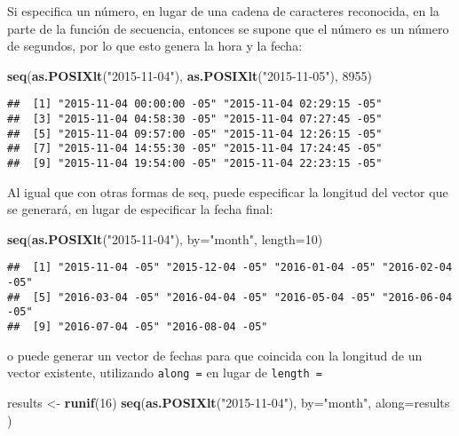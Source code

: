 \documentclass[]{article}
\newenvironment{Shaded}{\begin{snugshade}}{\end{snugshade}}
\newcommand{\KeywordTok}[1]{\textcolor[rgb]{0.13,0.29,0.53}{\textbf{#1}}}
\newcommand{\DataTypeTok}[1]{\textcolor[rgb]{0.13,0.29,0.53}{#1}}
\newcommand{\DecValTok}[1]{\textcolor[rgb]{0.00,0.00,0.81}{#1}}
\newcommand{\StringTok}[1]{\textcolor[rgb]{0.31,0.60,0.02}{#1}}
\newcommand{\NormalTok}[1]{#1}
\begin{document}
Si especifica un número, en lugar de una cadena de caracteres
reconocida, en la parte de la función de secuencia, entonces se supone
que el número es un número de segundos, por lo que esto genera la hora y
la fecha:

\begin{Shaded}
\begin{Highlighting}[]
\KeywordTok{seq}\NormalTok{(}\KeywordTok{as.POSIXlt}\NormalTok{(}\StringTok{"2015-11-04"}\NormalTok{), }\KeywordTok{as.POSIXlt}\NormalTok{(}\StringTok{"2015-11-05"}\NormalTok{), }\DecValTok{8955}\NormalTok{)}
\end{Highlighting}
\end{Shaded}

\begin{verbatim}
##  [1] "2015-11-04 00:00:00 -05" "2015-11-04 02:29:15 -05"
##  [3] "2015-11-04 04:58:30 -05" "2015-11-04 07:27:45 -05"
##  [5] "2015-11-04 09:57:00 -05" "2015-11-04 12:26:15 -05"
##  [7] "2015-11-04 14:55:30 -05" "2015-11-04 17:24:45 -05"
##  [9] "2015-11-04 19:54:00 -05" "2015-11-04 22:23:15 -05"
\end{verbatim}

Al igual que con otras formas de seq, puede especificar la longitud del
vector que se generará, en lugar de especificar la fecha final:

\begin{Shaded}
\begin{Highlighting}[]
\KeywordTok{seq}\NormalTok{(}\KeywordTok{as.POSIXlt}\NormalTok{(}\StringTok{"2015-11-04"}\NormalTok{), }\DataTypeTok{by=}\StringTok{"month"}\NormalTok{, }\DataTypeTok{length=}\DecValTok{10}\NormalTok{)}
\end{Highlighting}
\end{Shaded}

\begin{verbatim}
##  [1] "2015-11-04 -05" "2015-12-04 -05" "2016-01-04 -05" "2016-02-04 -05"
##  [5] "2016-03-04 -05" "2016-04-04 -05" "2016-05-04 -05" "2016-06-04 -05"
##  [9] "2016-07-04 -05" "2016-08-04 -05"
\end{verbatim}

o puede generar un vector de fechas para que coincida con la longitud de
un vector existente, utilizando \texttt{along\ =} en lugar de
\texttt{length\ =}

\begin{Shaded}
\begin{Highlighting}[]
\NormalTok{results <-}\StringTok{ }\KeywordTok{runif}\NormalTok{(}\DecValTok{16}\NormalTok{)}
\KeywordTok{seq}\NormalTok{(}\KeywordTok{as.POSIXlt}\NormalTok{(}\StringTok{"2015-11-04"}\NormalTok{), }\DataTypeTok{by=}\StringTok{"month"}\NormalTok{, }\DataTypeTok{along=}\NormalTok{results )}
\end{Highlighting}
\end{Shaded}
\end{document}
